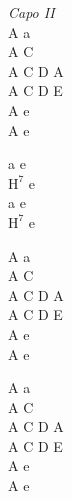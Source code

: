 \begin{chord}
    \small{
        \textit{Capo II}\\
        A a\\
        A C\\
        A C D A\\
        A C D E\\
        A e\\
        A e

        a e\\
        $\mathrm{H^{7}}$ e\\
        a e\\
        $\mathrm{H^{7}}$ e

        A a\\
        A C\\
        A C D A\\
        A C D E\\
        A e\\
        A e

        A a\\
        A C\\
        A C D A\\
        A C D E\\
        A e\\
        A e
    }
\end{chord}
